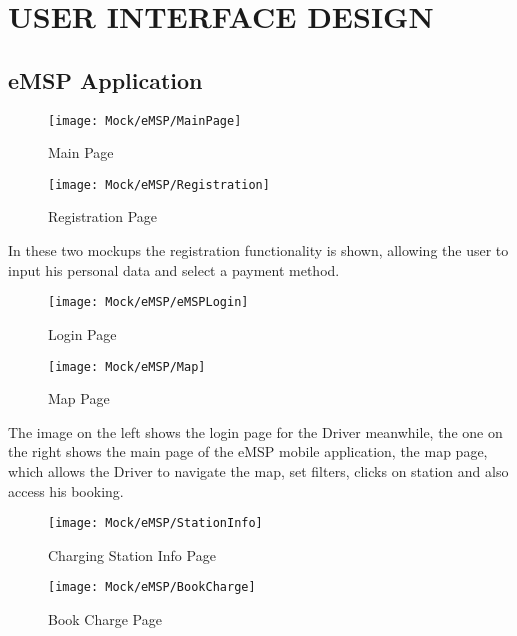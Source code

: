 \newcommand\case{\stepcounter{case}\arabic{case}}
\chapter{USER INTERFACE DESIGN}
\label{ch:interfaceDesign}%
\section{eMSP Application}

\begin{figure}[H]
    \begin{minipage}[t]{.45\textwidth} %
    \texttt{[image: Mock/eMSP/MainPage]}
    \caption{Main Page}
    \label{fig:MainPage}
\end{minipage}
\hfill
\begin{minipage}[t]{.45\textwidth}
    \texttt{[image: Mock/eMSP/Registration]}
    \caption{Registration Page}
    \label{fig:Registration}
\end{minipage}
\end{figure}
In these two mockups the registration functionality is shown, allowing the user to input his personal data and select a payment method.
\begin{figure}[H]
    \begin{minipage}[t]{.45\textwidth} %
    \texttt{[image: Mock/eMSP/eMSPLogin]}
    \caption{Login Page}
    \label{fig:eMSPLogin}
\end{minipage}
\hfill
\begin{minipage}[t]{.45\textwidth}
    \texttt{[image: Mock/eMSP/Map]}
    \caption{Map Page}
    \label{fig:Map}
\end{minipage}
\end{figure}
The image on the left shows the login page for the Driver meanwhile, the one on the right shows the main page of the eMSP mobile application, the map page, which allows the Driver to navigate the map, set filters, clicks on station and also access his booking.
\begin{figure}[H]
    \begin{minipage}[t]{.45\textwidth} %
    \texttt{[image: Mock/eMSP/StationInfo]}
    \caption{Charging Station Info Page}
    \label{fig:StationInfo}
\end{minipage}
\hfill
\begin{minipage}[t]{.45\textwidth}
    \texttt{[image: Mock/eMSP/BookCharge]}
    \caption{Book Charge Page}
    \label{fig:BookCharge}
\end{minipage}
\end{figure}
